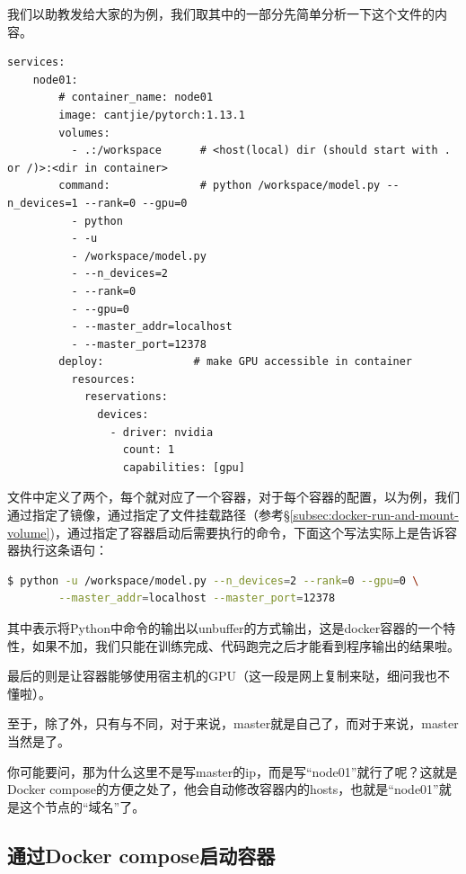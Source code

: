 我们以助教发给大家的为例，我们取其中的一部分先简单分析一下这个文件的内容。
\begin{lstlisting}
services:
    node01:           
        # container_name: node01
        image: cantjie/pytorch:1.13.1
        volumes:
          - .:/workspace      # <host(local) dir (should start with . or /)>:<dir in container>
        command:              # python /workspace/model.py --n_devices=1 --rank=0 --gpu=0
          - python
          - -u
          - /workspace/model.py 
          - --n_devices=2
          - --rank=0
          - --gpu=0
          - --master_addr=localhost
          - --master_port=12378
        deploy:              # make GPU accessible in container
          resources:
            reservations:
              devices:
                - driver: nvidia
                  count: 1
                  capabilities: [gpu]
\end{lstlisting}

文件中定义了两个，每个就对应了一个容器，对于每个容器的配置，以为例，我们通过指定了镜像，通过指定了文件挂载路径（参考\S\ref{subsec:docker-run-and-mount-volume})，通过指定了容器启动后需要执行的命令，下面这个写法实际上是告诉容器执行这条语句：
\begin{lstlisting}[language=bash]
    $ python -u /workspace/model.py --n_devices=2 --rank=0 --gpu=0 \
        --master_addr=localhost --master_port=12378
\end{lstlisting}
其中表示将Python中命令的输出以unbuffer的方式输出，这是docker容器的一个特性，如果不加，我们只能在训练完成、代码跑完之后才能看到程序输出的结果啦。

最后的则是让容器能够使用宿主机的GPU（这一段是网上复制来哒，细问我也不懂啦）。

至于，除了外，只有与不同，对于来说，master就是自己了，而对于来说，master当然是了。

你可能要问，那为什么这里不是写master的ip，而是写“node01”就行了呢？这就是Docker compose的方便之处了，他会自动修改容器内的hosts，也就是“node01”就是这个节点的“域名”了。

\subsection{通过Docker compose启动容器}

